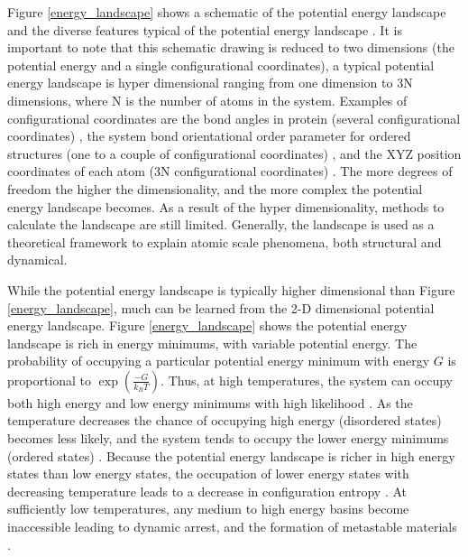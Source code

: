 Figure \ref{energy_landscape} shows a schematic of the potential energy landscape and the diverse features typical of the potential energy landscape \cite{Debenedetti2001}.  It is important to note that this schematic drawing is reduced to two dimensions (the potential energy and a single configurational coordinates), a typical potential energy landscape is hyper dimensional ranging from one dimension to 3N dimensions, where N is the number of atoms in the system.  Examples of configurational coordinates are the bond angles in protein (several configurational coordinates) \cite{Wales2012}, the system bond orientational order parameter for ordered structures (one to a couple of configurational coordinates) \cite{Quigley2008}, and the XYZ position coordinates of each atom (3N configurational coordinates) \cite{Kushima2009, Kushima2009a}. The more degrees of freedom the higher the dimensionality, and the more complex the potential energy landscape becomes.  As a result of the hyper dimensionality, methods to calculate the landscape are still limited.  Generally, the landscape is used as a theoretical framework to explain atomic scale phenomena, both structural and dynamical.

While the potential energy landscape is typically higher dimensional than Figure \ref{energy_landscape}, much can be learned from the 2-D dimensional potential energy landscape.  Figure \ref{energy_landscape} shows the potential energy landscape is rich in energy minimums, with variable potential energy.  The probability of occupying a particular potential energy minimum with energy $G$ is proportional to $\exp(\frac{-G}{k_BT})$.  Thus, at high temperatures, the system can occupy both high energy and low energy minimums with high likelihood \cite{Royall2015}.  As the temperature decreases the chance of occupying high energy (disordered states) becomes less likely, and the system tends to occupy the lower energy minimums (ordered states) \cite{Royall2015}.  Because the potential energy landscape is richer in high energy states than low energy states, the occupation of lower energy states with decreasing temperature leads to a decrease in configuration entropy \cite{Royall2015}.  At sufficiently low temperatures, any medium to high energy basins become inaccessible leading to dynamic arrest, and the formation of  metastable materials \cite{Royall2015}.


